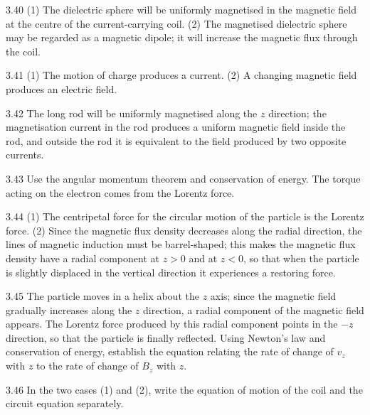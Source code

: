 \begin{hint}{3.40}
(1) The dielectric sphere will be uniformly magnetised in the magnetic field at the centre of the current-carrying coil. (2) The magnetised dielectric sphere may be regarded as a magnetic dipole; it will increase the magnetic flux through the coil.
\end{hint}

\begin{hint}{3.41}
(1) The motion of charge produces a current. (2) A changing magnetic field produces an electric field.
\end{hint}

\begin{hint}{3.42}
The long rod will be uniformly magnetised along the $z$ direction; the magnetisation current in the rod produces a uniform magnetic field inside the rod, and outside the rod it is equivalent to the field produced by two opposite currents.
\end{hint}

\begin{hint}{3.43}
Use the angular momentum theorem and conservation of energy. The torque acting on the electron comes from the Lorentz force.
\end{hint}

\begin{hint}{3.44}
(1) The centripetal force for the circular motion of the particle is the Lorentz force. (2) Since the magnetic flux density decreases along the radial direction, the lines of magnetic induction must be barrel-shaped; this makes the magnetic flux density have a radial component at $z>0$ and at $z<0$, so that when the particle is slightly displaced in the vertical direction it experiences a restoring force.
\end{hint}

\begin{hint}{3.45}
The particle moves in a helix about the $z$ axis; since the magnetic field gradually increases along the $z$ direction, a radial component of the magnetic field appears. The Lorentz force produced by this radial component points in the $-z$ direction, so that the particle is finally reflected. Using Newton's law and conservation of energy, establish the equation relating the rate of change of $v_z$ with $z$ to the rate of change of $B_z$ with $z$.
\end{hint}

\begin{hint}{3.46}
In the two cases (1) and (2), write the equation of motion of the coil and the circuit equation separately.
\end{hint}

